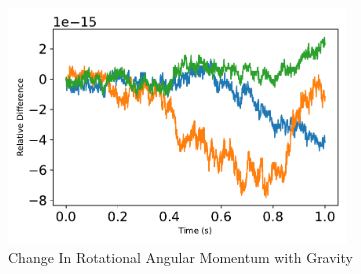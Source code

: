\begin{figure}[htbp]\centerline{\includegraphics[width=0.8\textwidth]{AutoTeX/ChangeInRotationalAngularMomentum1}}\caption{Change In Rotational Angular Momentum with Gravity}\label{fig:ChangeInRotationalAngularMomentum1}\end{figure}